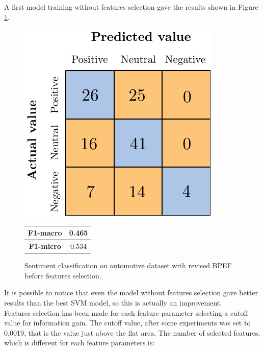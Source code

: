 A first model training without features selection gave the results shown in Figure \ref{fig:ita_snt_bpef_bfs}.

\begin{figure}[H]
	\begin{minipage}[b]{0.6\linewidth}
		\centering
		\includegraphics[scale=1]{figures/conf_matrices/ita_snt_bpef/ita_snt_bpef_bfs.pdf}
	\end{minipage}
	\begin{minipage}[b]{0.3\linewidth}
		\begin{tabular}[b]{ | c | c | } 
			\hline
			\textbf{F1-macro} & 0.465 \\
			\hline
			\textbf{F1-micro} & 0.534 \\ 
			\hline
		\end{tabular}
	\end{minipage}
	\caption{Sentiment classification on automotive dataset with revised BPEF before features selection.}
	\label{fig:ita_snt_bpef_bfs}
\end{figure}

It is possible to notice that even the model without features selection gave better results than the best SVM model, so this is actually an improvement.\\
Features selection has been made for each feature parameter selecting a cutoff value for information gain. The cutoff value, after some experiments was set to 0.0019, that is the value just above the flat area. The number of selected features, which is different for each feature parameters is:

